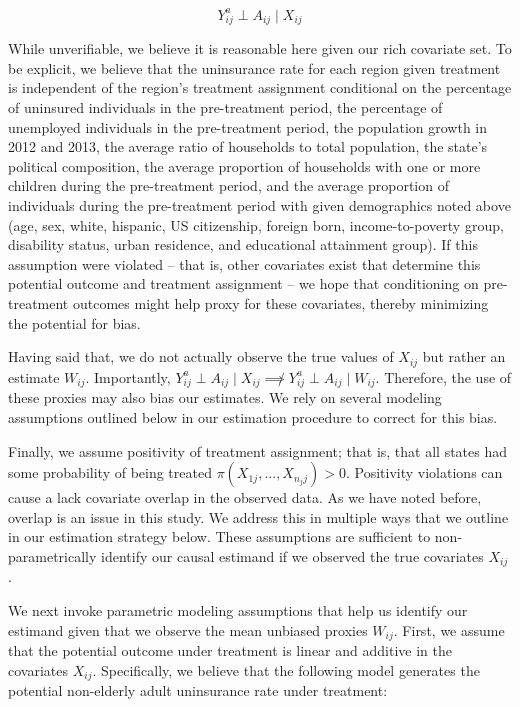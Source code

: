 \documentclass[12pt]{article}
\begin{document}
$$
Y_{ij}^a \perp A_{ij} \mid X_{ij}
$$

While unverifiable, we believe it is reasonable here given our rich covariate set. To be explicit, we believe that the uninsurance rate for each region given treatment is independent of the region's treatment assignment conditional on the percentage of uninsured individuals in the pre-treatment period, the percentage of unemployed individuals in the pre-treatment period, the population growth in 2012 and 2013, the average ratio of households to total population, the state's political composition, the average proportion of households with one or more children during the pre-treatment period, and the average proportion of individuals during the pre-treatment period with given demographics noted above (age, sex, white, hispanic, US citizenship, foreign born, income-to-poverty group, disability status, urban residence, and educational attainment group). If this assumption were violated -- that is, other covariates exist that determine this potential outcome and treatment assignment -- we hope that conditioning on pre-treatment outcomes might help proxy for these covariates, thereby minimizing the potential for bias. 

Having said that, we do not actually observe the true values of $X_{ij}$ but rather an estimate $W_{ij}$. Importantly, $Y_{ij}^a \perp A_{ij} \mid X_{ij} \not\implies Y_{ij}^a \perp A_{ij} \mid W_{ij}$. Therefore, the use of these proxies may also bias our estimates. We rely on several modeling assumptions outlined below in our estimation procedure to correct for this bias.

Finally, we assume positivity of treatment assignment; that is, that all states had some probability of being treated $\pi(X_{1j}, ..., X_{n_jj}) > 0$. Positivity violations can cause a lack covariate overlap in the observed data. As we have noted before, overlap is an issue in this study. We address this in multiple ways that we outline in our estimation strategy below. These assumptions are sufficient to non-parametrically identify our causal estimand if we observed the true covariates $X_{ij}$. 

We next invoke parametric modeling assumptions that help us identify our estimand given that we observe the mean unbiased proxies $W_{ij}$. First, we assume that the potential outcome under treatment is linear and additive in the covariates $X_{ij}$. Specifically, we believe that the following model generates the potential non-elderly adult uninsurance rate under treatment:
\end{document}
